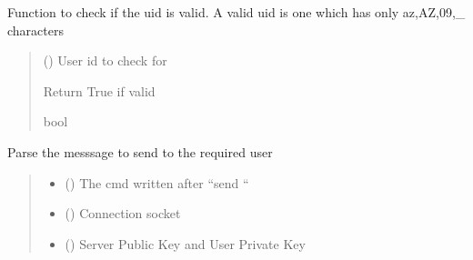 \documentclass[letterpaper,10pt,english]{sphinxmanual}
\begin{document}
\begin{fulllineitems}
\label{\detokenize{userInputHandler:userInputHandler.checkValidityOfUID}}
\pysigstartsignatures
{}
\pysigstopsignatures
\sphinxAtStartPar
Function to check if the uid is valid. A valid uid is one which has only a\sphinxhyphen{}z,A\sphinxhyphen{}Z,0\sphinxhyphen{}9,\_ characters
\begin{quote}\begin{description}
\sphinxAtStartPar
{} () \textendash{} User id to check for

\sphinxAtStartPar
Return True if valid

\sphinxAtStartPar
bool

\end{description}\end{quote}

\end{fulllineitems}


\begin{fulllineitems}
\label{\detokenize{userInputHandler:userInputHandler.sendMessage}}
\pysigstartsignatures
{}
\pysigstopsignatures
\sphinxAtStartPar
Parse the messsage to send to the required user
\begin{quote}\begin{description}
\begin{itemize}
\item {} 
\sphinxAtStartPar
{} () \textendash{} The cmd written after “send “

\item {} 
\sphinxAtStartPar
{} () \textendash{} Connection socket

\item {} 
\sphinxAtStartPar
{} () \textendash{} Server Public Key and User Private Key

\end{itemize}

\end{description}\end{quote}

\end{fulllineitems}
\end{document}
